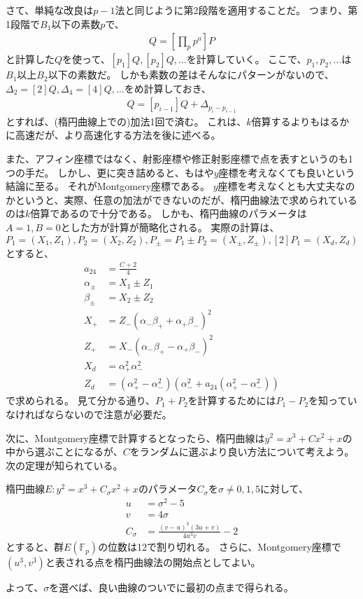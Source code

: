 さて、単純な改良は$p-1$法と同じように第2段階を適用することだ。
つまり、第1段階で$B_1$以下の素数$p$で、
\begin{align*}
Q = \left[\prod_{p} p^a\right] P
\end{align*}
と計算した$Q$を使って、$[p_1]Q, [p_2]Q, \ldots$を計算していく。
ここで、$p_1,p_2,\ldots$は$B_1$以上$B_2$以下の素数だ。
しかも素数の差はそんなにパターンがないので、$\Delta_2=[2]Q, \Delta_4=[4]Q,\ldots$をめ計算しておき、
\begin{align*}
[p_i]Q = [p_{i-1}]Q + \Delta_{p_i-p_{i-1}}
\end{align*}
とすれば、(楕円曲線上での)加法1回で済む。
これは、$k$倍算するよりもはるかに高速だが、より高速化する方法を後に述べる。

また、アフィン座標ではなく、射影座標や修正射影座標で点を表すというのも1つの手だ。
しかし、更に突き詰めると、もはや$y$座標を考えなくても良いという結論に至る。
それがMontgomery座標である。
$y$座標を考えなくとも大丈夫なのかというと、実際、任意の加法ができないのだが、楕円曲線法で求められているのは$k$倍算であるので十分である。
しかも、楕円曲線のパラメータは$A=1,B=0$とした方が計算が簡略化される。
実際の計算は、$P_1=(X_1,Z_1), P_2=(X_2,Z_2), P_{\pm}=P_1{\pm}P_2=(X_{\pm},Z_{\pm}),[2]P_1=(X_d,Z_d)$とすると、
\begin{align*}
a_{24} &= \frac{C + 2}{4}\\
\alpha_{\pm} &= X_1 \pm Z_1\\
\beta_{\pm} &= X_2 \pm Z_2\\
X_+ &= Z_-(\alpha_-\beta_+ + \alpha_+\beta_-)^2\\
Z_+ &= X_-(\alpha_-\beta_+ - \alpha_+\beta_-)^2\\
X_d &= \alpha_+^2\alpha_-^2\\
Z_d &= (\alpha_+^2 - \alpha_-^2)(\alpha_-^2 + a_{24}(\alpha_+^2 - \alpha_-^2))
\end{align*}
で求められる。
見て分かる通り、$P_1+P_2$を計算するためには$P_1-P_2$を知っていなければならないので注意が必要だ。

次に、Montgomery座標で計算するとなったら、楕円曲線は$y^2=x^3+Cx^2+x$の中から選ぶことになるが、$C$をランダムに選ぶより良い方法について考えよう。
次の定理が知られている。

\begin{Theo}{}{}
楕円曲線$E:y^2=x^3+C_{\sigma}x^2+x$のパラメータ$C_{\sigma}$を$\sigma\neq0,1,5$に対して、
\begin{align*}
u &= \sigma^2 - 5\\
v &= 4\sigma\\
C_{\sigma} &= \frac{(v - u)^3(3u+v)}{4u^3v} - 2
\end{align*}
とすると、群$E(\mathbb{F}_p)$の位数は12で割り切れる。
さらに、Montgomery座標で$(u^3,v^3)$と表される点を楕円曲線法の開始点としてよい。
\end{Theo}

よって、$\sigma$を選べば、良い曲線のついでに最初の点まで得られる。

